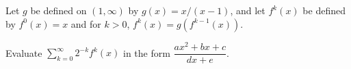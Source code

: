 Let $g$ be defined on $(1, \infty)$ by $g(x) = x/(x - 1)$, and let $f^k(x)$ be
defined by $f^0(x) = x$ and for $k > 0$, $f^k(x) = g(f^{k-1}(x))$.

Evaluate $\displaystyle{\sum_{k=0}^{\infty} 2^{-k} f^k(x)}$ in the form
$\dfrac{ax^2 + bx + c}{dx + e}$.
